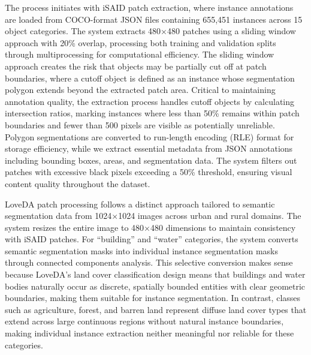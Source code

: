 The process initiates with iSAID patch extraction, where instance annotations are loaded from COCO-format JSON files containing 655,451 instances across 15 object categories. The system extracts 480$\times$480 patches using a sliding window approach with 20\% overlap, processing both training and validation splits through multiprocessing for computational efficiency. The sliding window approach creates the risk that objects may be partially cut off at patch boundaries, where a cutoff object is defined as an instance whose segmentation polygon extends beyond the extracted patch area. Critical to maintaining annotation quality, the extraction process handles cutoff objects by calculating intersection ratios, marking instances where less than 50\% remains within patch boundaries and fewer than 500 pixels are visible as potentially unreliable. Polygon segmentations are converted to run-length encoding (RLE) format for storage efficiency, while we extract essential metadata from JSON annotations including bounding boxes, areas, and segmentation data. The system filters out patches with excessive black pixels exceeding a 50\% threshold, ensuring visual content quality throughout the dataset.

LoveDA patch processing follows a distinct approach tailored to semantic segmentation data from 1024$\times$1024 images across urban and rural domains. The system resizes the entire image to 480$\times$480 dimensions to maintain consistency with iSAID patches. For ``building'' and ``water'' categories, the system converts semantic segmentation masks into individual instance segmentation masks through connected components analysis. This selective conversion makes sense because LoveDA's land cover classification design means that buildings and water bodies naturally occur as discrete, spatially bounded entities with clear geometric boundaries, making them suitable for instance segmentation. In contrast, classes such as agriculture, forest, and barren land represent diffuse land cover types that extend across large continuous regions without natural instance boundaries, making individual instance extraction neither meaningful nor reliable for these categories.

